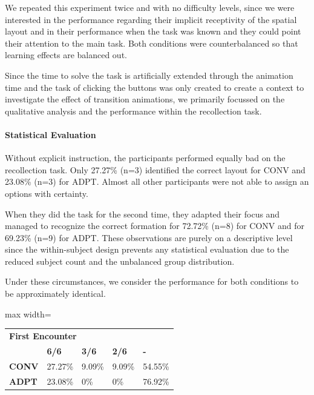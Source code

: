 \documentclass[sigconf]{nimeart}
\begin{document}
We repeated this experiment twice and with no difficulty levels, since we were interested in the performance regarding their implicit receptivity of the spatial layout and in their performance when the task was known and they could point their attention to the main task. Both conditions were counterbalanced so that learning effects are balanced out.

Since the time to solve the task is artificially extended through the animation time and the task of clicking the buttons was only created to create a context to investigate the effect of transition animations, we primarily focussed on the qualitative analysis and the performance within the recollection task.

\paragraph{Statistical Evaluation}\label{statistical-evaluation-1}

Without explicit instruction, the participants performed equally bad on the recollection task. Only 27.27\% (n=3) identified the correct layout for CONV and 23.08\% (n=3) for ADPT. Almost all other participants were not able to assign an options with certainty.

When they did the task for the second time, they adapted their focus and managed to recognize the correct formation for 72.72\% (n=8) for CONV and for 69.23\% (n=9) for ADPT. These observations are purely on a descriptive level since the within-subject design prevents any statistical evaluation due to the reduced subject count and the unbalanced group distribution.

Under these circumstances, we consider the performance for both conditions to be approximately identical.

\begin{table}[htbp]\centering\small
\begin{adjustbox}{max width=\textwidth}\begin{tabular}{lllll}
\toprule
\midrule
\multicolumn{5}{l}{%
\textbf{First Encounter}} \\
 & \textbf{6/6} & \textbf{3/6} & \textbf{2/6} & \textbf{-} \\
\textbf{CONV} & 27.27\% & 9.09\% & 9.09\% & 54.55\% \\
\textbf{ADPT} & 23.08\% & 0\% & 0\% & 76.92\% \\
\bottomrule
\end{tabular}\end{adjustbox}\end{table}
\end{document}
